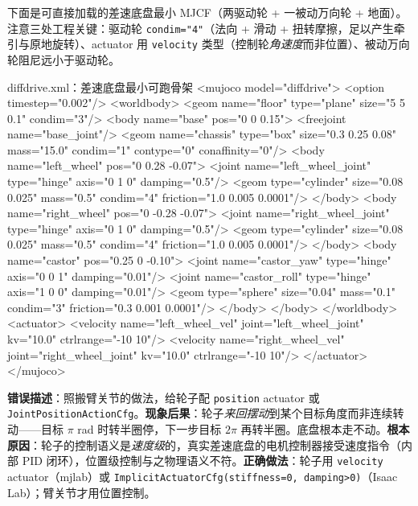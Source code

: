 下面是可直接加载的差速底盘最小 MJCF（两驱动轮 + 一被动万向轮 + 地面）。注意三处工程关键：驱动轮 \verb|condim="4"|（法向 + 滑动 + 扭转摩擦，足以产生牵引与原地旋转）、actuator 用 \verb|velocity| 类型（控制轮\emph{角速度}而非位置）、被动万向轮阻尼远小于驱动轮。

\begin{codebox}[text]{diffdrive.xml：差速底盘最小可跑骨架}
<mujoco model="diffdrive">
  <option timestep="0.002"/>
  <worldbody>
    <geom name="floor" type="plane" size="5 5 0.1" condim="3"/>
    <body name="base" pos="0 0 0.15">
      <freejoint name="base_joint"/>
      <geom name="chassis" type="box" size="0.3 0.25 0.08" mass="15.0"
            condim="1" contype="0" conaffinity="0"/>
      <body name="left_wheel" pos="0 0.28 -0.07">
        <joint name="left_wheel_joint" type="hinge" axis="0 1 0" damping="0.5"/>
        <geom type="cylinder" size="0.08 0.025" mass="0.5"
              condim="4" friction="1.0 0.005 0.0001"/>
      </body>
      <body name="right_wheel" pos="0 -0.28 -0.07">
        <joint name="right_wheel_joint" type="hinge" axis="0 1 0" damping="0.5"/>
        <geom type="cylinder" size="0.08 0.025" mass="0.5"
              condim="4" friction="1.0 0.005 0.0001"/>
      </body>
      <body name="castor" pos="0.25 0 -0.10">
        <joint name="castor_yaw" type="hinge" axis="0 0 1" damping="0.01"/>
        <joint name="castor_roll" type="hinge" axis="1 0 0" damping="0.01"/>
        <geom type="sphere" size="0.04" mass="0.1"
              condim="3" friction="0.3 0.001 0.0001"/>
      </body>
    </body>
  </worldbody>
  <actuator>
    <velocity name="left_wheel_vel"  joint="left_wheel_joint"  kv="10.0" ctrlrange="-10 10"/>
    <velocity name="right_wheel_vel" joint="right_wheel_joint" kv="10.0" ctrlrange="-10 10"/>
  </actuator>
</mujoco>
\end{codebox}

\begin{pitfall}
\textbf{错误描述}：照搬臂关节的做法，给轮子配 \verb|position| actuator 或 \verb|JointPositionActionCfg|。\textbf{现象后果}：轮子\emph{来回摆动}到某个目标角度而非连续转动——目标 $\pi$ rad 时转半圈停，下一步目标 $2\pi$ 再转半圈。底盘根本走不动。\textbf{根本原因}：轮子的控制语义是\emph{速度级}的，真实差速底盘的电机控制器接受速度指令（内部 PID 闭环），位置级控制与之物理语义不符。\textbf{正确做法}：轮子用 \verb|velocity| actuator（mjlab）或 \verb|ImplicitActuatorCfg(stiffness=0, damping>0)|（Isaac Lab）；臂关节才用位置控制。
\end{pitfall}

